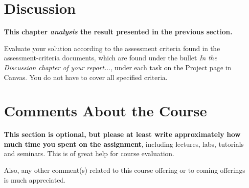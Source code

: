 \documentclass[a4paper]{scrartcl}
\begin{document}
\pagebreak

\section{Discussion}

\textbf{This chapter \textit{analysis} the result presented in the previous section.} 

Evaluate your solution according to the assessment criteria found in the assessment-criteria documents, which are found under the bullet \textit{In the Discussion chapter of your report...}, under each task on the Project page in Canvas. You do not have to cover all specified criteria.

\section{Comments About the Course}

\textbf{This section is optional, but please at least write approximately how much time you spent on the assignment}, including lectures, labs, tutorials and seminars. This is of great help for course evaluation.

Also, any other comment(s) related to this course offering or to coming offerings is much appreciated. 
\end{document}
